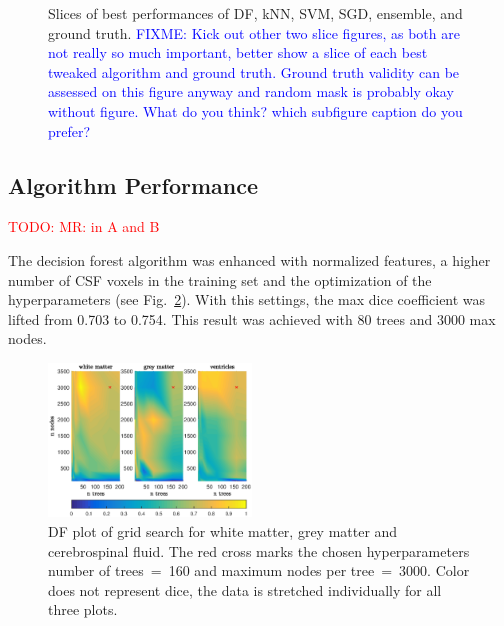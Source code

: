 \documentclass[journal]{IEEEtran}
\newcommand\TODO[1]{\textcolor{red}{TODO: #1}}
\newcommand\FIXME[1]{\textcolor{blue}{FIXME: #1}}
\begin{document}
\begin{figure}[h!]
	\hfill
	\caption{Slices of best performances of \protect{} DF, \protect{} kNN, \protect{} SVM, \protect{} SGD, \protect{} ensemble, and \protect{} ground truth.
		\FIXME{Kick out other two slice figures, as both are not really so much important, better show a slice of each best tweaked algorithm and ground truth. Ground truth validity can be assessed on this figure anyway and random mask is probably okay without figure. What do you think? which subfigure caption do you prefer?}}
	\label{f.slices_all}
\end{figure}

\subsection{Algorithm Performance}
\TODO{MR: in A and B}



The decision forest algorithm was enhanced with normalized features, a higher number of CSF voxels in the training set and the optimization of the hyperparameters (see Fig.~\ref{f.df_gridsearch}). With this settings, the max dice coefficient was lifted from 0.703 to 0.754. This result was achieved with 80 trees and 3000 max nodes.

\begin{figure}[h!]
	\centering
	\includegraphics[width=0.48\textwidth]{images/df_grid}
	\caption{DF plot of grid search for white matter, grey matter and cerebrospinal fluid. The red cross marks the chosen hyperparameters number of trees~=~160 and maximum nodes per tree~=~3000. Color does not represent dice, the data is stretched individually for all three plots.}\label{f.df_gridsearch}
\end{figure}
\end{document}
